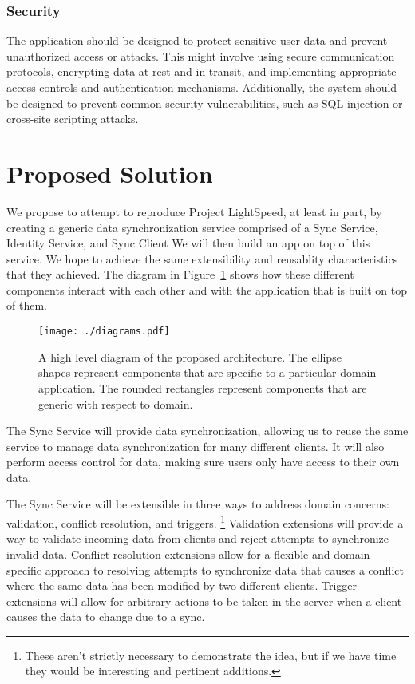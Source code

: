 \documentclass[12pt]{article}
\begin{document}
            \subsubsection{Security}
            The application should be designed to protect sensitive user data and prevent unauthorized access or attacks.
            This might involve using secure communication protocols, encrypting data at rest and in transit, and implementing appropriate access controls and authentication mechanisms.
            Additionally, the system should be designed to prevent common security vulnerabilities, such as SQL injection or cross-site scripting attacks.


    \section{Proposed Solution}
    We propose to attempt to reproduce Project LightSpeed, at least in part, by creating a generic data synchronization service comprised of a Sync Service, Identity Service, and Sync Client We will then build an app on top of this service.
    We hope to achieve the same extensibility and reusablity characteristics that they achieved.
    The diagram in Figure~\ref{fig:high-level} shows how these different components interact with each other and with the application that is built on top of them.

    \begin{figure}
        \centering
        \texttt{[image: ./diagrams.pdf]}
        \caption{A high level diagram of the proposed architecture. The ellipse shapes represent components that are specific to a particular domain application. The rounded rectangles represent components that are generic with respect to domain. \label{fig:high-level}}
    \end{figure}

    The Sync Service will provide data synchronization, allowing us to reuse the same service to manage data synchronization for many different clients.
    It will also perform access control for data, making sure users only have access to their own data.

    The Sync Service will be extensible in three ways to address domain concerns: validation, conflict resolution, and triggers.
        \footnote{These aren't strictly necessary to demonstrate the idea, but if we have time they would be interesting and pertinent additions.}
        Validation extensions will provide a way to validate incoming data from clients and reject attempts to synchronize invalid data.
        Conflict resolution extensions allow for a flexible and domain specific approach to resolving attempts to synchronize data that causes a conflict where the same data has been modified by two different clients.
        Trigger extensions will allow for arbitrary actions to be taken in the server when a client causes the data to change due to a sync.
\end{document}
